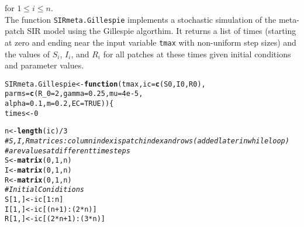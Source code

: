 \documentclass{article}\usepackage[]{graphicx}\usepackage[]{color}
\makeatletter
\newcommand{\hlnum}[1]{\textcolor[rgb]{0.686,0.059,0.569}{#1}}%
\newcommand{\hlcom}[1]{\textcolor[rgb]{0.678,0.584,0.686}{\textit{#1}}}%
\newcommand{\hlopt}[1]{\textcolor[rgb]{0,0,0}{#1}}%
\newcommand{\hlstd}[1]{\textcolor[rgb]{0.345,0.345,0.345}{#1}}%
\newcommand{\hlkwa}[1]{\textcolor[rgb]{0.161,0.373,0.58}{\textbf{#1}}}%
\newcommand{\hlkwb}[1]{\textcolor[rgb]{0.69,0.353,0.396}{#1}}%
\newcommand{\hlkwc}[1]{\textcolor[rgb]{0.333,0.667,0.333}{#1}}%
\newcommand{\hlkwd}[1]{\textcolor[rgb]{0.737,0.353,0.396}{\textbf{#1}}}%
\newenvironment{kframe}{%
 \def\at@end@of@kframe{}%
 \ifinner\ifhmode%
  \def\at@end@of@kframe{\end{minipage}}%
  \begin{minipage}{\columnwidth}%
 \fi\fi%
 \def\FrameCommand##1{\hskip\@totalleftmargin \hskip-\fboxsep
 \colorbox{shadecolor}{##1}\hskip-\fboxsep
     \hskip-\linewidth \hskip-\@totalleftmargin \hskip\columnwidth}%
 \MakeFramed {\advance\hsize-\width
   \@totalleftmargin\z@ \linewidth\hsize
   \@setminipage}}%
 {\par\unskip\endMakeFramed%
 \at@end@of@kframe}
\newenvironment{knitrout}{}{} %
\makeatother
\begin{document}
for $1 \leq i \leq n$. \\
The function \verb|SIRmeta.Gillespie| implements a stochastic simulation of the meta-patch SIR model using the Gillespie algorthim. It returns a list of times (starting at zero and ending near the input variable \verb|tmax| with non-uniform step sizes) and the values of $S_i$, $I_i$, and $R_i$ for all patches at these times given initial conditions and parameter values.

\begin{knitrout}
\color{fgcolor}\begin{kframe}
\begin{alltt}
\hlstd{SIRmeta.Gillespie} \hlkwb{<-} \hlkwa{function}\hlstd{(}\hlkwc{tmax}\hlstd{,}\hlkwc{ic}\hlstd{=}\hlkwd{c}\hlstd{(S0,I0,R0),}
                              \hlkwc{parms}\hlstd{=}\hlkwd{c}\hlstd{(}\hlkwc{R_0}\hlstd{=}\hlnum{2}\hlstd{,}\hlkwc{gamma}\hlstd{=}\hlnum{0.25}\hlstd{,}\hlkwc{mu}\hlstd{=}\hlnum{4e-5}\hlstd{,}
                                      \hlkwc{alpha}\hlstd{=}\hlnum{0.1}\hlstd{,}\hlkwc{m}\hlstd{=}\hlnum{0.2}\hlstd{,}\hlkwc{EC}\hlstd{=}\hlnum{TRUE}\hlstd{))\{}
  \hlstd{times} \hlkwb{<-} \hlnum{0}

  \hlstd{n} \hlkwb{<-} \hlkwd{length}\hlstd{(ic)}\hlopt{/}\hlnum{3}
  \hlcom{#S, I, R matrices: column index is patch index and rows (added later in while loop) }
  \hlcom{#are values at different time steps}
  \hlstd{S} \hlkwb{<-} \hlkwd{matrix}\hlstd{(}\hlnum{0}\hlstd{,}\hlnum{1}\hlstd{,n)}
  \hlstd{I} \hlkwb{<-} \hlkwd{matrix}\hlstd{(}\hlnum{0}\hlstd{,}\hlnum{1}\hlstd{,n)}
  \hlstd{R} \hlkwb{<-} \hlkwd{matrix}\hlstd{(}\hlnum{0}\hlstd{,}\hlnum{1}\hlstd{,n)}
  \hlcom{#Initial Coniditions}
  \hlstd{S[}\hlnum{1}\hlstd{,]} \hlkwb{<-} \hlstd{ic[}\hlnum{1}\hlopt{:}\hlstd{n]}
  \hlstd{I[}\hlnum{1}\hlstd{,]} \hlkwb{<-} \hlstd{ic[(n}\hlopt{+}\hlnum{1}\hlstd{)}\hlopt{:}\hlstd{(}\hlnum{2}\hlopt{*}\hlstd{n)]}
  \hlstd{R[}\hlnum{1}\hlstd{,]} \hlkwb{<-} \hlstd{ic[(}\hlnum{2}\hlopt{*}\hlstd{n}\hlopt{+}\hlnum{1}\hlstd{)}\hlopt{:}\hlstd{(}\hlnum{3}\hlopt{*}\hlstd{n)]}


\end{alltt}
\end{kframe}
\end{knitrout}
\end{document}
